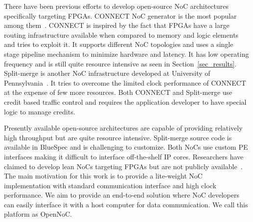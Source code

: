 %
There have been previous efforts to develop open-source NoC architectures specifically targeting FPGAs.
CONNECT NoC generator is the most popular among them~\cite{papa_connect_fpga2012}.
CONNECT is inspired by the fact that FPGAs have a large routing infrastructure available when compared to memory and logic elements and tries to exploit it. 
It supports different NoC topologies and uses a single stage pipeline mechanism  to minimize hardware and latency. 
It has low operating frequency and is still quite resource intensive as seen in Section~\ref{sec_results}. 
Split-merge is another NoC infrastructure developed at University of Pennsylvania~\cite{Huan2012}.
It tries to overcome the limited clock performance of CONNECT at the expense of few more resources.
Both CONNECT and Split-merge use credit based traffic control and requires the application developer to have special logic to manage credits.

Presently available open-source architectures are capable of providing relatively high throughput but are quite resource intensive.
Split-merge source code is available in BlueSpec and is challenging to customize.
Both NoCs use custom PE interfaces making it difficult to interface off-the-shelf IP cores.
Researchers have claimed to develop lean NoCs targeting FPGAs but are not publicly available~\cite{hoplite_fpl2015}.
The main motivation for this work is to provide a lite-weight NoC implementation with standard communication interface and high clock performance.
We aim to provide an end-to-end solution where NoC developers can easily interface it with a host computer for data communication.
We call this platform as OpenNoC.